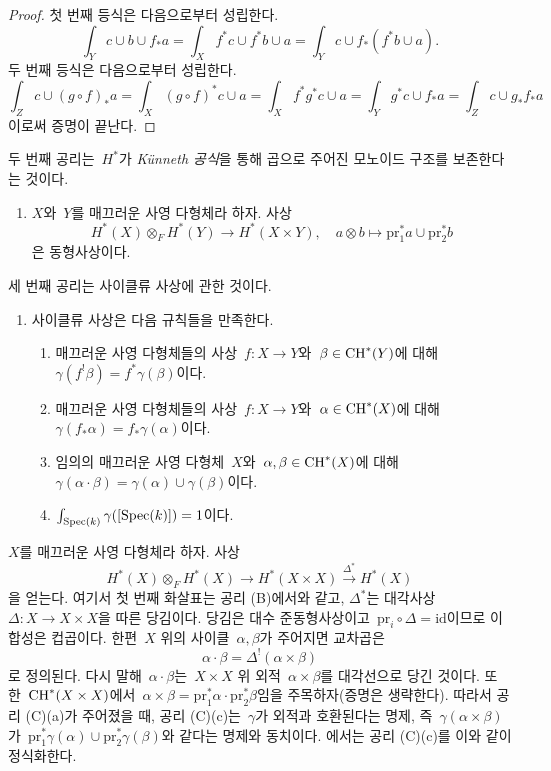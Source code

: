 \begin{proof}
첫 번째 등식은 다음으로부터 성립한다.
$$
\int_Y c \cup b \cup f_*a =
\int_X f^*c \cup f^*b \cup a =
\int_Y c \cup f_*(f^*b \cup a).
$$
두 번째 등식은 다음으로부터 성립한다.
$$
\int_Z c \cup (g \circ f)_*a = \int_X (g \circ f)^*c \cup a =
\int_X f^* g^* c \cup a = \int_Y g^*c \cup f_*a = \int_Z c \cup g_*f_*a
$$
이로써 증명이 끝난다.
\end{proof}

\noindent
두 번째 공리는\  $H^*$가 {\it K\"unneth 공식}을 통해 곱으로 주어진
모노이드 구조를 보존한다는 것이다.
\begin{enumerate}
\item[(B)] $X$와\  $Y$를 매끄러운 사영 다형체라 하자. 사상
$$
H^*(X) \otimes_F H^*(Y) \to H^*(X \times Y),\quad
a \otimes b \mapsto \text{pr}_1^*a \cup \text{pr}_2^*b
$$
은 동형사상이다.
\end{enumerate}
세 번째 공리는 사이클류 사상에 관한 것이다.
\begin{enumerate}
\item[(C)] 사이클류 사상은 다음 규칙들을 만족한다.
\begin{enumerate}
\item 매끄러운 사영 다형체들의 사상\  $f : X \to Y$와\ 
$\beta \in \mathop{\mathrm{CH}}\nolimits^*(Y)$에 대해\ 
$\gamma(f^!\beta) = f^*\gamma(\beta)$이다.
\item 매끄러운 사영 다형체들의 사상\  $f : X \to Y$와\ 
$\alpha \in \mathop{\mathrm{CH}}\nolimits^*(X)$에 대해\ 
$\gamma(f_*\alpha) = f_*\gamma(\alpha)$이다.
\item 임의의 매끄러운 사영 다형체\  $X$와\ 
$\alpha, \beta \in \mathop{\mathrm{CH}}\nolimits^*(X)$에 대해\ 
$\gamma(\alpha \cdot \beta) = \gamma(\alpha) \cup \gamma(\beta)$이다.
\item $\int_{\mathop{\mathrm{Spec}}(k)} \gamma([\mathop{\mathrm{Spec}}(k)]) = 1$이다.
\end{enumerate}
\end{enumerate}

\begin{remark}
\label{remark-replace-cup-product-classical}
$X$를 매끄러운 사영 다형체라 하자. 사상
$$
H^*(X) \otimes_F H^*(X) \longrightarrow H^*(X \times X)
\xrightarrow{\Delta^*} H^*(X)
$$
을 얻는다. 여기서 첫 번째 화살표는 공리 (B)에서와 같고,
$\Delta^*$는 대각사상\  $\Delta : X \to X \times X$을 따른 당김이다.
당김은 대수 준동형사상이고\ 
$\text{pr}_i \circ \Delta = \text{id}$이므로 이 합성은 컵곱이다.
한편\  $X$ 위의 사이클\  $\alpha, \beta$가 주어지면 교차곱은
$$
\alpha \cdot \beta =
\Delta^!(\alpha \times \beta)
$$
로 정의된다. 다시 말해\  $\alpha \cdot \beta$는\ 
$X \times X$ 위 외적\  $\alpha \times \beta$를 대각선으로 당긴 것이다.
또한\  $\mathop{\mathrm{CH}}\nolimits^*(X \times X)$에서\ 
$\alpha \times \beta = \text{pr}_1^*\alpha \cdot \text{pr}_2^*\beta$임을
주목하자(증명은 생략한다). 따라서 공리 (C)(a)가 주어졌을 때,
공리 (C)(c)는\  $\gamma$가 외적과 호환된다는 명제, 즉\ 
$\gamma(\alpha \times \beta)$가\ 
$\text{pr}_1^*\gamma(\alpha) \cup \text{pr}_2^*\gamma(\beta)$와
같다는 명제와 동치이다. \cite{Kleiman-cycles}에서는 공리 (C)(c)를
이와 같이 정식화한다.
\end{remark}

